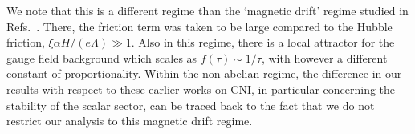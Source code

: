 We note that this is a different regime than the `magnetic drift' regime studied in Refs.~\cite{Adshead:2012kp,Dimastrogiovanni:2012ew,Adshead:2013qp,Adshead:2013nka}. There, the friction term was taken to be large compared to the Hubble friction, $\xi \alpha H/(e \Lambda)  \gg 1$. Also in this regime, there is a local attractor for the gauge field background which scales as $f(\tau) \sim 1/\tau$, with however a different constant of proportionality. Within the non-abelian regime, the difference in our results with respect to these earlier works on CNI, in particular concerning the stability of the scalar sector, can be traced back to the fact that we do not restrict our analysis to this magnetic drift regime.






